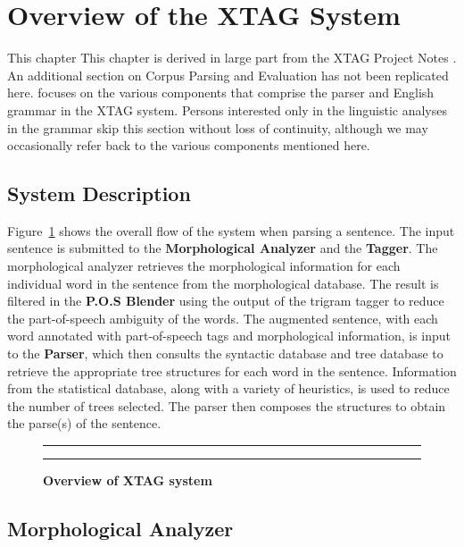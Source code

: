 \section{Overview of the XTAG System}
\label{overview}

This chapter {This chapter is derived in large part from the XTAG Project Notes
\cite{Xtag-notes}.  An additional section on Corpus Parsing and Evaluation has
not been replicated here.} focuses on the various components that comprise the
parser and English grammar in the XTAG system.  Persons interested only in the
linguistic analyses in the grammar skip this section without loss of
continuity, although we may occasionally refer back to the various components
mentioned here.

\subsection{System Description}

Figure~{\ref{flowchart}} shows the overall flow of the system when parsing a
sentence. The input sentence is submitted to the {\bf Morphological Analyzer}
and the {\bf Tagger}. The morphological analyzer retrieves the morphological
information for each individual word in the sentence from the morphological
database. The result is filtered in the {\bf P.O.S Blender} using the output of
the trigram tagger to reduce the part-of-speech ambiguity of the words. The
augmented sentence, with each word annotated with part-of-speech tags and
morphological information, is input to the {\bf Parser}, which then consults
the syntactic database and tree database to retrieve the appropriate tree
structures for each word in the sentence.  Information from the statistical
database, along with a variety of heuristics, is used to reduce the number of
trees selected. The parser then composes the structures to obtain the parse(s)
of the sentence.

\begin{figure}[ht]
\centering
\rule[.1in]{4.0in}{0.01in}
{}
\caption{\bf{Overview of XTAG system }}
\rule[.1in]{4.0in}{0.01in}
\label{flowchart}
\end{figure}

\subsection{Morphological Analyzer}

